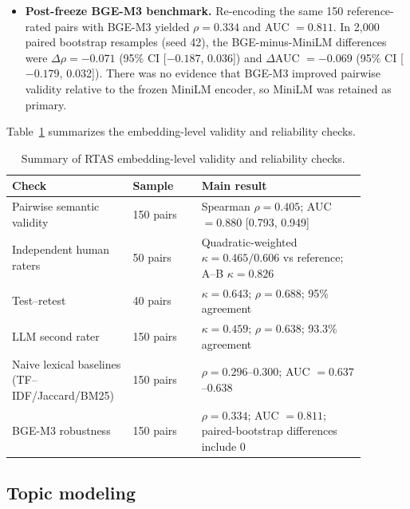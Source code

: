 \documentclass[11pt]{article}
\begin{document}
\begin{itemize}
\item \textbf{Post-freeze BGE-M3 benchmark.} Re-encoding the same 150 reference-rated pairs with BGE-M3 \citep{chen2024m3embedding} yielded $\rho=0.334$ and AUC $=0.811$. In 2,000 paired bootstrap resamples (seed 42), the BGE-minus-MiniLM differences were $\Delta\rho=-0.071$ (95\% CI [$-0.187$, 0.036]) and $\Delta$AUC $=-0.069$ (95\% CI [$-0.179$, 0.032]). There was no evidence that BGE-M3 improved pairwise validity relative to the frozen MiniLM encoder, so MiniLM was retained as primary.
\end{itemize}

Table~\ref{tab:validity} summarizes the embedding-level validity and reliability checks.

\begin{table}[H]
\centering
\caption{Summary of RTAS embedding-level validity and reliability checks.}
\label{tab:validity}
\begin{tabular}{p{0.27\linewidth}p{0.18\linewidth}p{0.43\linewidth}}
\toprule
Check & Sample & Main result\\
\midrule
Pairwise semantic validity & 150 pairs & Spearman $\rho=0.405$; AUC $=0.880$ [0.793, 0.949]\\
Independent human raters & 50 pairs & Quadratic-weighted $\kappa=0.465/0.606$ vs reference; A--B $\kappa=0.826$\\
Test--retest & 40 pairs & $\kappa=0.643$; $\rho=0.688$; 95\% agreement\\
LLM second rater & 150 pairs & $\kappa=0.459$; $\rho=0.638$; 93.3\% agreement\\
Naive lexical baselines (TF--IDF/Jaccard/BM25) & 150 pairs & $\rho=0.296$--0.300; AUC $=0.637$--0.638\\
BGE-M3 robustness & 150 pairs & $\rho=0.334$; AUC $=0.811$; paired-bootstrap differences include 0\\
\bottomrule
\end{tabular}
\end{table}

\subsection{Topic modeling}
\end{document}
